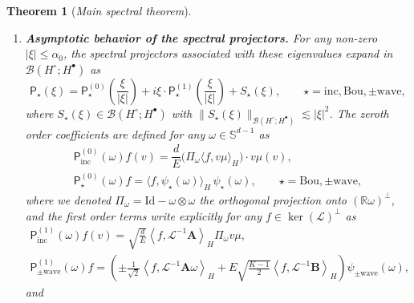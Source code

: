 \documentclass[10pt]{amsart}
\newtheorem{theo}{Theorem}[section]
\theoremstyle{definition}\newtheorem{defi}[theo]{Definition}\newtheorem{rema}[theo]{Remark}\newtheorem{exam}[theo]{Example}\newtheorem{exem}[theo]{Example}\newtheorem{nota}[theo]{Notation}
\newcommand{\Id}{\mathrm{Id}}
\newcommand{\Wave}{\mathrm{wave}}
\newcommand{\Inc}{\mathrm{inc}}
\newcommand{\Bou}{\mathrm{Bou}}
\newcommand{\BurA}{{\mathbf{A}}}
\newcommand{\BurB}{{\mathbf{B}}}
\newcommand{\R}{\mathbb{R}}
\renewcommand{\S}{\mathbb{S}}
\newcommand{\LL}{\mathcal{L}}
\newcommand{\PP}{\mathsf{P}}
\newcommand{\BBB}{\mathscr{B}}
\newcommand{\Ss}{H}
\newcommand{\Ssp}{H^{\bullet}}
\newcommand{\Ssm}{H^{\circ}}
\renewcommand*\le{\leqslant}
\newcommand{\la}{\langle}
\newcommand{\ra}{\rangle}
\begin{document}
\begin{theo}[\emph{Main spectral theorem}]
\begin{enumerate}
\begin{itemize}
\begin{equation}\label{eq:burnett}
\begin{split}
\begin{cases}
\BurA (v) & := \displaystyle \sqrt{ \frac{d}{E} } \left(v \otimes v - \frac{|v|^2}{d} \Id \right) \mu(v),\\
\\
\BurB (v) & := \displaystyle \frac{1}{\sqrt{K (K-1)}} v \left(K - \frac{|v|^2}{E} \right) \mu(v).
\end{cases}
\end{split}
\end{equation}
\end{itemize}
\item\label{theo1.8.2} \textit{\textbf{Asymptotic behavior of the spectral projectors.}} For any non-zero $| \xi | \le \alpha_0$, the spectral projectors associated with these eigenvalues expand in $\BBB\left(\Ssm ; \Ssp \right)$ as
\begin{equation}\label{eq:PPstar}
\PP_\star(\xi) = \PP^{(0)}_\star\left(\frac{\xi}{|\xi|} \right) + i \xi \cdot \PP^{(1)}_\star\left(\frac{\xi}{|\xi|} \right) + S_{\star}(\xi), \qquad \star=\Inc,\Bou,\pm\Wave,
\end{equation}
where $S_{\star}(\xi) \in \BBB(\Ssm;\Ssp)$ with $\|S_{\star}(\xi)\|_{\BBB(\Ssm;\Ssp)} \lesssim | \xi |^2$. The zeroth order coefficients are defined for any $\omega \in \S^{d-1}$ as
\begin{gather*}
\PP_\Inc^{(0)}\left(\omega \right) f(v)=\dfrac{d}{E} \big(\Pi_\omega \langle f, v \mu \rangle_{\Ss}\big) \cdot v \mu(v),\\
\PP_\star^{(0)}(\omega)f = \big\langle f, \psi_\star(\omega) \big\rangle_{\Ss} \, \psi_\star(\omega), \qquad \star = \Bou, \pm \Wave,
\end{gather*}
where we denoted $\Pi_\omega=\Id - \omega \otimes \omega$ the orthogonal projection onto $(\R \omega)^\perp$, and the first order terms write explicitly for any $f \in \ker(\LL)^\perp$ as
\begin{gather*}
\PP^{(1)}_\Inc(\omega) f(v) = \sqrt{\frac{d}{E}} \left\la f, \LL^{-1}\BurA \right\ra_{\Ss} \Pi_\omega v \mu,\\
\PP^{(1)}_{\pm \Wave}(\omega) f = \left(\pm \frac{1}{\sqrt{2} } \left\langle f, \LL^{-1}\BurA \omega \right\rangle_{\Ss} + E \sqrt{\frac{K-1}{2}} \left\langle f, \LL^{-1} \BurB \right\rangle_{\Ss} \right) \psi_{\pm \Wave}(\omega),
\end{gather*}
and
\begin{equation}\label{eq:P_1_Bou}

\end{equation}
\end{enumerate}
\end{theo}
\end{document}
